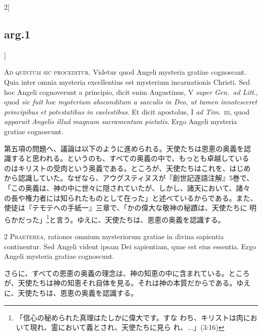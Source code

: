 \documentclass[paper=a4paper,fontsize=10pt,jafontsize=9pt,titlepage]{jlreq}
\begin{document}
\begin{paracol}{2}[\subsection{arg.1}]

{\huge A}{\scshape d quintum sic proceditur}. Videtur quod Angeli
mysteria gratiae cognoscant. Quia inter omnia mysteria excellentius
est mysterium incarnationis Christi. Sed hoc Angeli cognoverunt a
principio, dicit enim Augustinus, V {\itshape super Gen.~ad Litt}.,
quod {\itshape sic fuit hoc mysterium absconditum a saeculis in Deo,
ut tamen innotesceret principibus et potestatibus in caelestibus}. Et
dicit apostolus, I {\itshape ad Tim}.~{\scshape iii}, quod {\itshape
apparuit Angelis illud magnum sacramentum pietatis}. Ergo Angeli
mysteria gratiae cognoscunt.

\switchcolumn

第五項の問題へ、議論は以下のように進められる。天使たちは恩恵の奥義を認
識すると思われる。というのも、すべての奥義の中で、もっとも卓越している
のはキリストの受肉という奥義である。ところが、天使たちはこれを、はじめ
から認識していた。なぜなら、アウグスティヌスが『創世記逐語注解』5巻で、
「この奥義は、神の中に世々に隠されていたが、しかし、諸天において、諸々
の長や権力者には知られたものとして在った」と述べているからである。また、
使徒は『テモテへの手紙一』三章で、「かの偉大な敬神の秘蹟は、天使たちに
明らかだった」\footnote{「信心の秘められた真理はたしかに偉大です。すな
わち、キリストは肉において現れ、霊において義とされ、天使たちに見ら
れ、...」(3:16)}と言う。ゆえに、天使たちは、恩恵の奥義を認識する。


{\scshape 2 Praeterea}, rationes omnium mysteriorum gratiae in divina
sapientia continentur. Sed Angeli vident ipsam Dei sapientiam, quae
est eius essentia. Ergo Angeli mysteria gratiae cognoscunt.

\switchcolumn

さらに、すべての恩恵の奥義の理念は、神の知恵の中に含まれている。ところ
が、天使たちは神の知恵それ自体を見る。それは神の本質だからである。ゆえ
に、天使たちは、恩恵の奥義を認識する。



\end{paracol}
\end{document}
